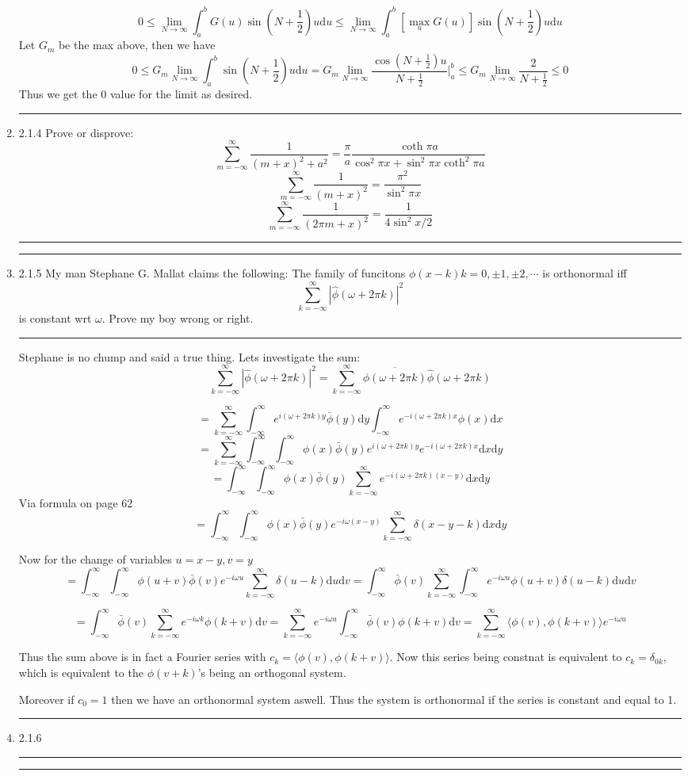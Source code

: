\documentclass[12pt]{article}
\newcommand{\rw}{\rightarrow}
\newcommand{\di}{\mathrm{d}}
\newcommand{\intinf}{\int_{-\infty}^\infty}
\newcommand{\suminf}[1]{\sum_{#1 = -\infty}^\infty}
\theoremstyle{definition}
\begin{document}
\begin{enumerate}
\[
0 \leq 
\lim_{N \rw \infty} \int_a^{b} G(u) \sin ( N +\frac 1 2)u \di u 
\leq
\lim_{N \rw \infty} \int_a^{b} [\max_u G(u)] \sin ( N +\frac 1 2)u \di u 
\]
Let $G_m$ be the max above, then we have
\[
0 \leq G_m\lim_{N \rw \infty} \int_a^{b} \sin ( N +\frac 1 2)u \di u 
= G_m\lim_{N \rw \infty}  
\frac{\cos ( N +\frac 1 2)u }
{N + \frac 1 2}|_a^{b}
\leq
 G_m\lim_{N \rw \infty}  
 \frac 2
{N + \frac 1 2}
\leq 0
\]
Thus we get the 0 value for the limit as desired.
\hrule
\item 2.1.4
Prove or disprove:
\[
\suminf{m} 
\frac 1 {(m+x)^2 + a^2} = \frac \pi a \frac {\coth \pi a } {\cos^2 \pi x + \sin^2 \pi x \coth^2 \pi a}
\]
\[
\suminf{m} 
\frac 1 {(m+x)^2} = \frac {\pi^2} { \sin^2 \pi x }
\]
\[
\suminf{m} 
\frac 1 {(2 \pi m+x)^2} = \frac {1} { 4 \sin^2 x/2 }
\]
\hrule
\hrule
\item 2.1.5
My man Stephane G. Mallat claims the following:
The family of funcitons $\phi(x-k) k = 0 ,\pm 1, \pm 2, \cdots$ is orthonormal iff 
\[
\suminf{k} |\hat \phi ( \omega +2\pi k)|^2 
\]
is constant wrt $\omega$.
Prove my boy wrong or right.
\hrule
Stephane is no chump and said a true thing. 
Lets investigate the sum:
\[
\suminf{k} |\hat \phi ( \omega +2\pi k)|^2 
=
\suminf{k} \overline{\hat \phi ( \omega +2\pi k)}
\hat \phi ( \omega +2\pi k) 
\]

\[
=
\suminf{k} 
\intinf e^{i (\omega+ 2\pi k)y}\bar \phi (y) \di y 
\intinf e^{-i (\omega+ 2\pi k)x} \phi (x) \di x 
\]
\[
=
\suminf{k} 
\intinf\intinf \phi (x)\bar \phi (y) e^{i (\omega+ 2\pi k)y}
 e^{-i (\omega+ 2\pi k)x}  \di x \di y 
\]
\[
=
\intinf\intinf \phi (x)\bar \phi (y) 
\suminf{k} 
 e^{-i (\omega + 2\pi k)(x-y)}  \di x \di y 
\]
Via formula on page 62
\[
=
\intinf\intinf \phi (x)\bar \phi (y) 
 e^{-i \omega(x-y)}  
\suminf{k} 
\delta(x-y-k)  \di x \di y 
\]

Now for the change of variables $u= x-y, v = y$
\[
=
\intinf\intinf \phi (u+v)\bar \phi (v) 
 e^{-i \omega u}  
\suminf{k} \delta(u-k)  \di u \di v 
=
\intinf\bar \phi (v) 
\suminf{k} \intinf e^{-i \omega u} \phi (u+v)\delta(u-k)  \di u \di v 
\]

\[
=
\intinf\bar \phi (v) 
\suminf{k}  e^{-i \omega k} \phi (k+v) \di v 
=
\suminf{k}
e^{-i \omega u}
\intinf\bar \phi (v) 
  \phi (k+v) \di v 
=
\suminf{k}
\langle \phi (v) ,
  \phi (k+v) \rangle 
  e^{-i \omega u}
\]

Thus the sum above is in fact a Fourier series with $c_k = 
\langle \phi (v) , \phi (k+v) \rangle $.
Now this series being constnat is equivalent to $c_k = \delta_{0k}$, which is equivalent to the $\phi(v+k)$'s being an orthogonal system.

Moreover if $c_0 =1$ then we have an orthonormal system aswell. Thus the system is orthonormal if the series is constant and equal to 1.


\hrule
\item 2.1.6

\hrule

\hrule



\end{enumerate}
\end{document}
